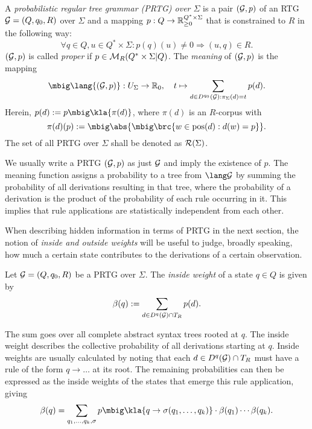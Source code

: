 \begin{definition}
 A \emph{probabilistic regular tree grammar (PRTG) over $\Sigma$} is a pair
 $(\mathcal G,p)$ of an RTG $\mathcal G=(Q,q_0,R)$ over $\Sigma$ and a mapping
 $p:Q\to\mathbb R_{\geq0}^{Q^*\times\Sigma}$ that is constrained to $R$ in the
 following way:
 \[
  \forall q\in Q, u\in Q^*\times\Sigma: p(q)(u) \neq 0 \Rightarrow (u,q) \in R.
 \]
 $(\mathcal G,p)$ is called \emph{proper} if $p\in\mathcal M_R(Q^*\times\Sigma|Q)$. The
 \emph{meaning} of $(\mathcal G,p)$ is the mapping
 \[
  \mbig\lang{(\ug,p)}: U_\Sigma \to \zr_0, \quad
  t \mapsto \sum_{d\in D^{q_0}(\ug): \pi_\Sigma(d)=t} p(d).
 \]
 Herein, $p(d) := p\mbig\kla{\pi(d)}$, where $\pi(d)$ is an $R$-corpus with
 \[
  \pi(d)(p) := \mbig\abs{\mbig\brc{w\in\pos(d): d(w)=p}}.
 \]
 The set of all PRTG over $\Sigma$ shall be denoted as $\mathcal R(\Sigma)$.
\end{definition}

We usually write a PRTG $(\mathcal G,p)$ as just $\mathcal G$ and imply the existence of $p$.
The meaning function assigns a probability to a tree from $\lang\ug$ by summing
the probability of all derivations resulting in that tree, where the
probability of a derivation is the product of the probability of each rule
occurring in it. This implies that rule applications are statistically
independent from each other.

When describing hidden information in terms of PRTG in the next section, the
notion of \emph{inside and outside weights} will be useful to judge, broadly
speaking, how much a certain state contributes to the derivations of a certain
observation.

\begin{definition}
 Let $\mathcal G = (Q,q_0,R)$ be a PRTG over $\Sigma$. The \emph{inside weight} of a
 state $q\in Q$ is given by
 \[
  \beta(q) := \sum_{d\in D^q(\mathcal G)\cap T_R} p(d).
 \]
\end{definition}

The sum goes over all complete abstract syntax trees rooted at $q$. The inside weight
describes the collective probability of all derivations starting at $q$. Inside
weights are usually calculated by noting that each $d\in D^q(\mathcal G)\cap T_R$ must
have a rule of the form $q\to\ldots$ at its root. The remaining probabilities
can then be expressed as the inside weights of the states that emerge this rule
application, giving
\[
 \beta(q) = \sum_{q_1,\ldots,q_k,\sigma} p\mbig\kla{q\to\sigma(q_1,\ldots,q_k)} \cdot \beta(q_1) \cdots \beta(q_k).
\]

